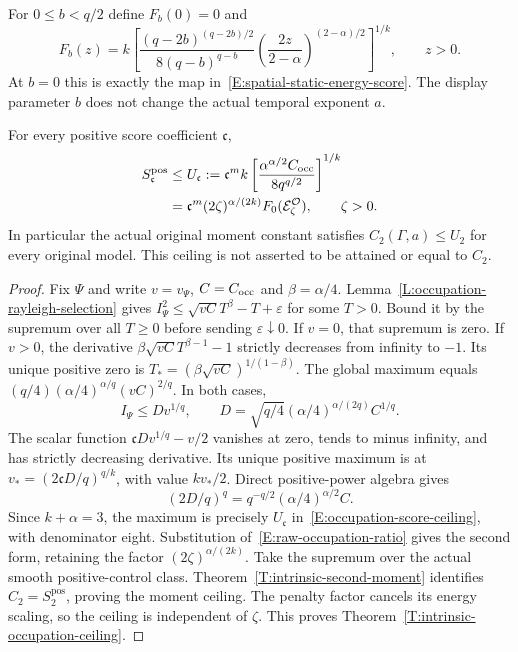 For $0\le b<q/2$ define $F_b(0)=0$ and
\begin{equation}\label{E:occupation-scalar-map}
  F_b(z)=k\left[
  \frac{(q-2b)^{(q-2b)/2}}{8(q-b)^{q-b}}
  \left(\frac{2z}{2-\alpha}\right)^{(2-\alpha)/2}
  \right]^{1/k},\qquad z>0.
\end{equation}
At $b=0$ this is exactly the map in~\eqref{E:spatial-static-energy-score}.
The display parameter $b$ does not change the actual temporal exponent $a$.

\begin{theorem}\label{T:intrinsic-occupation-ceiling}
  For every positive score coefficient $\mathfrak c$,
  \begin{align}
    S_{\mathfrak c}^{\mathrm{pos}}
    &\le U_{\mathfrak c}
    :=\mathfrak c^m k
    \left[\frac{\alpha^{\alpha/2}C_{\rm occ}}{8q^{q/2}}\right]^{1/k}
    \label{E:occupation-score-ceiling}\\
    &=\mathfrak c^m(2\zeta)^{\alpha/(2k)}
    F_0(\mathcal E_\zeta^{\mathcal O}),\qquad \zeta>0.\notag
  \end{align}
  In particular the actual original moment constant satisfies
  $C_2(\Gamma,a)\le U_2$ for every original model.
  This ceiling is not asserted to be attained or equal to $C_2$.
\end{theorem}

\begin{proof}
  Fix $\Psi$ and write $v=v_\Psi$, $C=C_{\rm occ}$ and $\beta=\alpha/4$.
  Lemma~\ref{L:occupation-rayleigh-selection} gives
  $I_\Psi^2\le\sqrt{vC}T^\beta-T+\varepsilon$ for some $T>0$.
  Bound it by the supremum over all $T\ge0$ before sending
  $\varepsilon\downarrow0$.
  If $v=0$, that supremum is zero.
  If $v>0$, the derivative
  $\beta\sqrt{vC}T^{\beta-1}-1$ strictly decreases from infinity to $-1$.
  Its unique positive zero is
  $T_*=(\beta\sqrt{vC})^{1/(1-\beta)}$.
  The global maximum equals
  $(q/4)(\alpha/4)^{\alpha/q}(vC)^{2/q}$.
  In both cases,
  \[
    I_\Psi\le Dv^{1/q},\qquad
    D=\sqrt{q/4}(\alpha/4)^{\alpha/(2q)}C^{1/q}.
  \]
  The scalar function $\mathfrak c Dv^{1/q}-v/2$ vanishes at zero,
  tends to minus infinity, and has strictly decreasing derivative.
  Its unique positive maximum is at
  $v_*=(2\mathfrak c D/q)^{q/k}$, with value $kv_*/2$.
  Direct positive-power algebra gives
  \[
    (2D/q)^q=q^{-q/2}(\alpha/4)^{\alpha/2}C .
  \]
  Since $k+\alpha=3$, the maximum is precisely $U_{\mathfrak c}$
  in~\eqref{E:occupation-score-ceiling}, with denominator eight.
  Substitution of~\eqref{E:raw-occupation-ratio} gives the second form,
  retaining the factor $(2\zeta)^{\alpha/(2k)}$.
  Take the supremum over the actual smooth positive-control class.
  Theorem~\ref{T:intrinsic-second-moment} identifies
  $C_2=S_2^{\mathrm{pos}}$, proving the moment ceiling.
  The penalty factor cancels its energy scaling, so the ceiling
  is independent of $\zeta$.
  This proves Theorem~\ref{T:intrinsic-occupation-ceiling}.
\end{proof}

